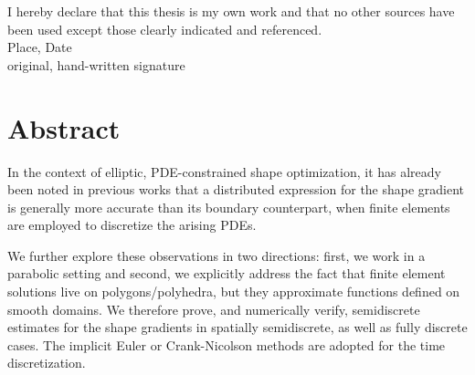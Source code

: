 \documentclass[english,a4paper,9pt,oneside]{scrbook}	%
\theoremstyle{break}
\theoremstyle{remark}
\begin{document}
\vspace*{23cm}
\noindent
I hereby declare that this thesis is my own work and that no other sources have been used except those clearly indicated and referenced.
\\[2cm]
Place, Date\\
original, hand-written signature
\newpage

%
%
%



\newpage
\section*{Abstract}
In the context of elliptic, PDE-constrained shape optimization, it has already been noted in previous works that a distributed expression for the shape gradient is generally more accurate than its boundary counterpart, when finite elements are employed to discretize the arising PDEs. 

We further explore these observations in two directions: first, we work in a parabolic setting and second, we explicitly address the fact that finite element solutions live on polygons/polyhedra, but they approximate functions defined on smooth domains. We therefore prove, and numerically verify, semidiscrete estimates for the shape gradients in spatially semidiscrete, as well as fully discrete cases. The implicit Euler or Crank-Nicolson methods are adopted for the time discretization.

\end{document}
